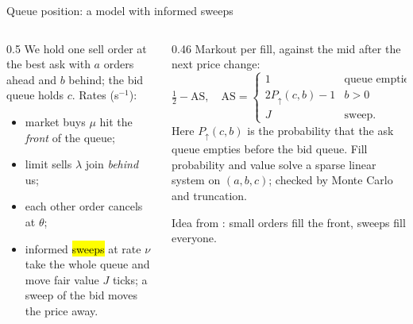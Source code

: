 \begin{frame}{Queue position: a model with informed sweeps}
  \begin{columns}[T]
    \begin{column}{0.5\textwidth}
      \small
      We hold one sell order at the best ask with $a$ orders ahead and $b$ behind; the bid queue holds $c$. Rates (s$^{-1}$):
      \begin{itemize}
        \item market buys $\mu$ hit the \emph{front} of the queue;
        \item limit sells $\lambda$ join \emph{behind} us;
        \item each other order cancels at $\theta$;
        \item informed \hl{sweeps} at rate $\nu$ take the whole queue and move fair value $J$ ticks; a sweep of the bid moves the price away.
      \end{itemize}
    \end{column}
    \begin{column}{0.46\textwidth}
      \small
      Markout per fill, against the mid after the next price change:
      \[ \tfrac12 - \mathrm{AS}, \quad \mathrm{AS} = \begin{cases} 1 & \text{queue emptied}\\ 2P_\uparrow(c,b) - 1 & b>0\\ J & \text{sweep.}\end{cases} \]
      Here $P_\uparrow(c,b)$ is the probability that the ask queue empties before the bid queue.
      Fill probability and value solve a sparse linear system on $(a,b,c)$; checked by Monte Carlo and truncation.

      \vspace{0.3em}
      Idea from \citet{moallemi2017queue}: small orders fill the front, sweeps fill everyone.
    \end{column}
  \end{columns}
\end{frame}

